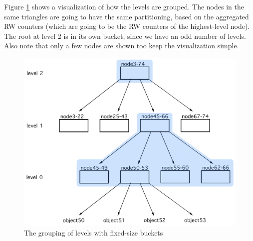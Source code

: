 Figure \ref{fig:fixed-size-buckets} shows a visualization of how the levels are grouped. The nodes in the same triangles are going to have the same partitioning, based on the aggregated RW counters (which are going to be the RW counters of the highest-level node). The root at level 2 is in its own bucket, since we have an odd number of levels. Also note that only a few nodes are shown too keep the visualization simple.

\begin{figure}[!htb]
  \centering
  \includegraphics[width=\textwidth,height=\textheight,keepaspectratio]{img/grouped-levels.png}
  \caption{ The grouping of levels with fixed-size buckets}
  \label{fig:fixed-size-buckets}
\end{figure}

